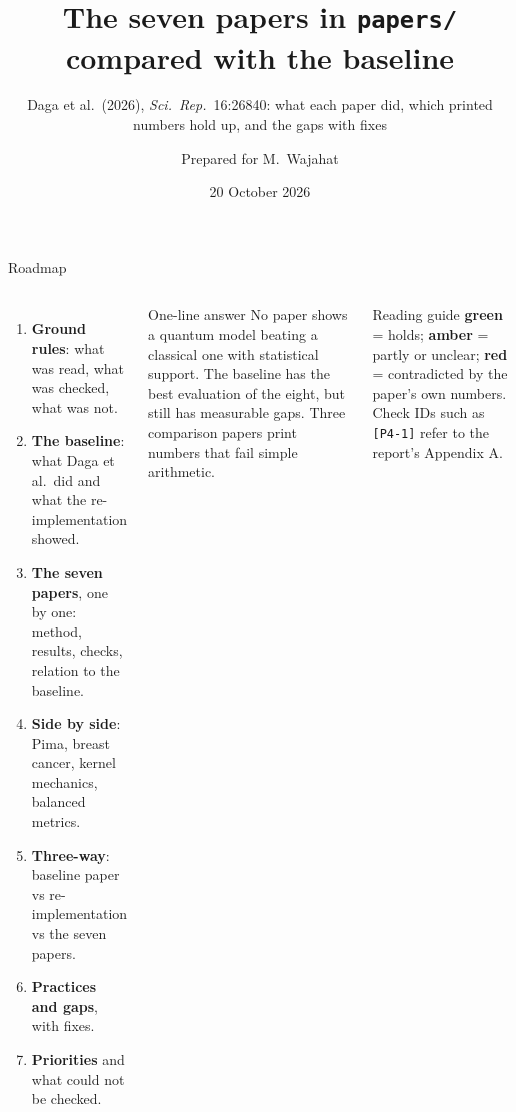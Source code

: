 \documentclass[aspectratio=169,10pt,t,xcolor={table}]{beamer}
\title[Seven papers vs the baseline]{The seven papers in \texttt{papers/} compared with the baseline}
\subtitle{Daga et al.\ (2026), \emph{Sci.\ Rep.}\ 16:26840: what each paper did, which printed numbers hold up, and the gaps with fixes}
\author[M.~Wajahat]{Prepared for M.~Wajahat}
\institute[]{Repository \texttt{Adaptive-Quantum-Kernel-Selection}; full report: \texttt{PAPERS\_COMPARISON\_REPORT.pdf}}
\date{20 October 2026}
\newcommand{\ok}[1]{\textcolor{qgreen}{\textbf{#1}}}
\newcommand{\bad}[1]{\textcolor{qred}{\textbf{#1}}}
\newcommand{\warn}[1]{\textcolor{qamber}{\textbf{#1}}}
\begin{document}
\begin{frame}[plain]
\titlepage
\end{frame}

\begin{frame}{Roadmap}
\begin{columns}[T]
\begin{enumerate}
  \item \textbf{Ground rules}: what was read, what was checked, what was not.
  \item \textbf{The baseline}: what Daga et al.\ did and what the re-implementation showed.
  \item \textbf{The seven papers}, one by one: method, results, checks, relation to the baseline.
  \item \textbf{Side by side}: Pima, breast cancer, kernel mechanics, balanced metrics.
  \item \textbf{Three-way}: baseline paper vs re-implementation vs the seven papers.
  \item \textbf{Practices and gaps}, with fixes.
  \item \textbf{Priorities} and what could not be checked.
\end{enumerate}
\begin{block}{One-line answer}
No paper shows a quantum model beating a classical one with statistical support. The baseline has the best evaluation of the eight, but still has measurable gaps. Three comparison papers print numbers that fail simple arithmetic.
\end{block}
\begin{exampleblock}{Reading guide}
\ok{green} = holds; \warn{amber} = partly or unclear; \bad{red} = contradicted by the paper's own numbers. Check IDs such as \texttt{[P4-1]} refer to the report's Appendix A.
\end{exampleblock}
\end{columns}
\end{frame}

\end{document}
